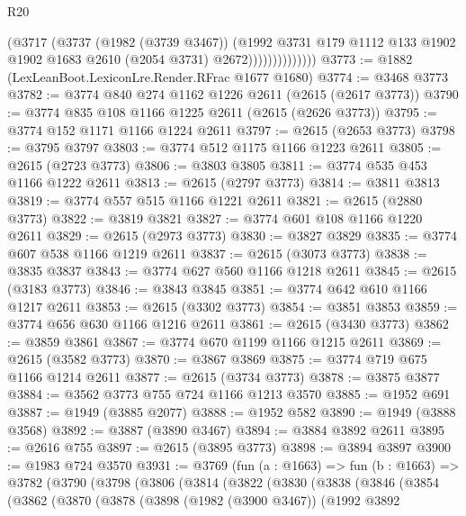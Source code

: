 \begin{lexlean}{R20}
\begin{coremodule}
                          (@3717
                            (@3737
                              (@1982 (@3739 @3467))
                              (@1992
                                @3731
                                @179
                                @1112
                                @133
                                @1902
                                @1902
                                @1683
                                @2610
                                (@2054 @3731)
                                @2672))))))))))))))
@3773 := @1882 (LexLeanBoot.LexiconLre.Render.RFrac @1677 @1680)
@3774 := @3468 @3773
@3782 := @3774 @840 @274 @1162 @1226 @2611 (@2615 (@2617 @3773))
@3790 := @3774 @835 @108 @1166 @1225 @2611 (@2615 (@2626 @3773))
@3795 := @3774 @152 @1171 @1166 @1224 @2611
@3797 := @2615 (@2653 @3773)
@3798 := @3795 @3797
@3803 := @3774 @512 @1175 @1166 @1223 @2611
@3805 := @2615 (@2723 @3773)
@3806 := @3803 @3805
@3811 := @3774 @535 @453 @1166 @1222 @2611
@3813 := @2615 (@2797 @3773)
@3814 := @3811 @3813
@3819 := @3774 @557 @515 @1166 @1221 @2611
@3821 := @2615 (@2880 @3773)
@3822 := @3819 @3821
@3827 := @3774 @601 @108 @1166 @1220 @2611
@3829 := @2615 (@2973 @3773)
@3830 := @3827 @3829
@3835 := @3774 @607 @538 @1166 @1219 @2611
@3837 := @2615 (@3073 @3773)
@3838 := @3835 @3837
@3843 := @3774 @627 @560 @1166 @1218 @2611
@3845 := @2615 (@3183 @3773)
@3846 := @3843 @3845
@3851 := @3774 @642 @610 @1166 @1217 @2611
@3853 := @2615 (@3302 @3773)
@3854 := @3851 @3853
@3859 := @3774 @656 @630 @1166 @1216 @2611
@3861 := @2615 (@3430 @3773)
@3862 := @3859 @3861
@3867 := @3774 @670 @1199 @1166 @1215 @2611
@3869 := @2615 (@3582 @3773)
@3870 := @3867 @3869
@3875 := @3774 @719 @675 @1166 @1214 @2611
@3877 := @2615 (@3734 @3773)
@3878 := @3875 @3877
@3884 := @3562 @3773 @755 @724 @1166 @1213 @3570
@3885 := @1952 @691
@3887 := @1949 (@3885 @2077)
@3888 := @1952 @582
@3890 := @1949 (@3888 @3568)
@3892 := @3887 (@3890 @3467)
@3894 := @3884 @3892 @2611
@3895 := @2616 @755
@3897 := @2615 (@3895 @3773)
@3898 := @3894 @3897
@3900 := @1983 @724 @3570
@3931 := @3769
    (fun (a : @1663) =>
    fun (b : @1663) =>
    @3782
      (@3790
        (@3798
          (@3806
            (@3814
              (@3822
                (@3830
                  (@3838
                    (@3846
                      (@3854
                        (@3862
                          (@3870
                            (@3878
                              (@3898
                                (@1982 (@3900 @3467))
                                (@1992
                                  @3892

\end{coremodule}
\end{lexlean}

